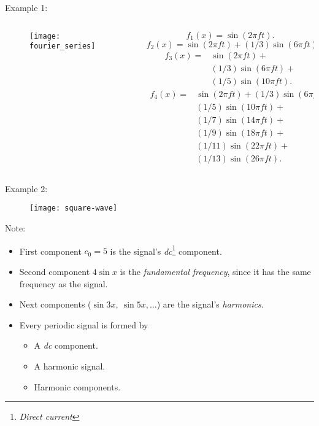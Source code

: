 \begin{frame}
Example 1:
\begin{columns}
\begin{column}{.5\textwidth}
\begin{figure}
\centering
\texttt{[image: fourier\_series]}
\end{figure}
\end{column}
\begin{column}{.5\textwidth}
\[
f_{1}(x) = \sin(2\pi ft).
\]
\[
f_{2}(x) = \sin(2\pi ft) + (1/3)\sin(6\pi ft).
\]
\[
\begin{split}
f_{3}(x) = & \sin(2\pi ft) + \\
&(1/3)\sin(6\pi ft) + \\
& (1/5)\sin(10\pi ft).
\end{split}
\]
\[
\begin{split}
f_{4}(x) = & \sin(2\pi ft) + (1/3)\sin(6\pi ft) + \\
& (1/5)\sin(10\pi ft) + \\
&(1/7)\sin(14\pi ft) + \\
& (1/9)\sin(18\pi ft) + \\
&(1/11)\sin(22\pi ft) + \\
& (1/13)\sin(26\pi ft).
\end{split}
\]
\end{column}
\end{columns}
\end{frame}


\begin{frame}
Example 2:
\begin{figure}
\centering
\texttt{[image: square-wave]}
\end{figure}
\end{frame}


\begin{frame}
Note:
\begin{itemize}
\item First component $c_{0} = 5$ is the signal's \textit{dc}\footnote{\textit{Direct current}} component.
\item Second component $4\sin x$ is the \textit{fundamental frequency}, since it has the same frequency as the signal.
\item Next components ($\sin 3x,\ \sin 5x, \ldots$) are the signal's \textit{harmonics}.
\item Every periodic signal is formed by
\begin{itemize}
\item A \textit{dc} component.
\item A harmonic signal.
\item Harmonic components.
\end{itemize}
\end{itemize}
\end{frame}

